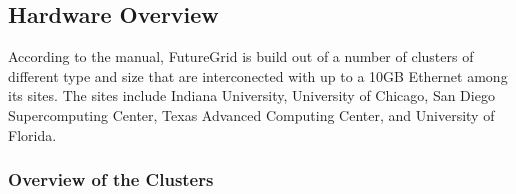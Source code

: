
\subsection{Hardware Overview}

According to the manual, FutureGrid is build out of a number of clusters of different type and size that are interconected with up to a 10GB Ethernet among its sites. The sites include Indiana University, University of Chicago, San Diego Supercomputing Center, Texas Advanced Computing Center, and University of Florida.

\subsubsection{Overview of the Clusters}\label{S:hw-cluster} 

